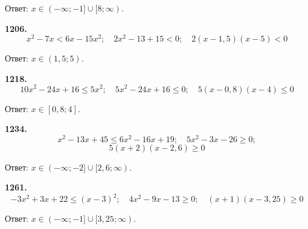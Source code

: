 \null \hspace*{\fill}Ответ: $x\in(-\infty;-1]\cup[8;\infty).$

\textbf{1206.} $$x^2-7x<6x-15x^2;\quad 2x^2-13+15<0;\quad 2(x-1,5)(x-5)<0$$

\begin{figure}[h!]
\end{figure}

\null \hspace*{\fill} Ответ: $x\in(1,5;5)$.

\newpage \textbf{1218.} $$10x^2-24x+16\leq 5x^2;\quad 5x^2-24x+16\leq 0;\quad 5(x-0,8)(x-4)\leq0$$

\begin{figure}[h!]
\end{figure}

\null \hspace*{\fill} Ответ: $x\in[0,8;4]$. 

\textbf{1234.} $$x^2-13x+45\leq 6x^2-16x+19;\quad 5x^2-3x-26\geq0;$$ $$ 5(x+2)(x-2,6)\geq0$$

\begin{figure}[h!]
\end{figure}

\null \hspace*{\fill} Ответ: $x\in(-\infty;-2]\cup[2,6;\infty)$. 

\textbf{1261.} $$-3x^2+3x+22\leq(x-3)^2;\quad 4x^2-9x-13\geq0;\quad(x+1)(x-3,25)\geq0$$

\begin{figure}[h!]
\end{figure}

\null \hspace*{\fill} Ответ: $x\in(-\infty;-1]\cup[3,25;\infty)$. 